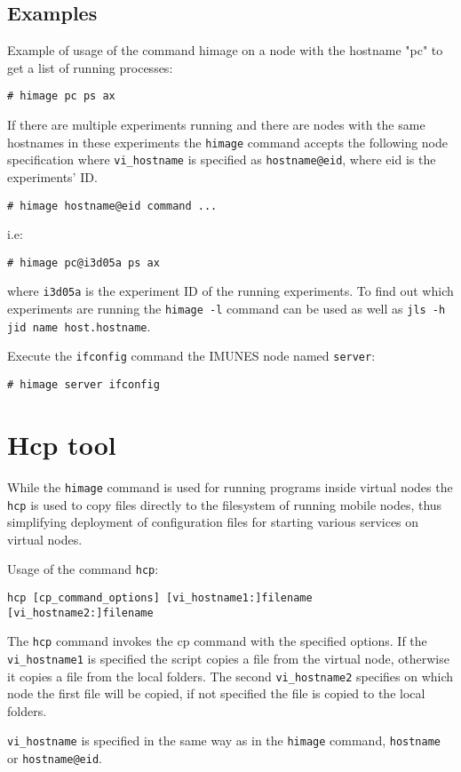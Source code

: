 \subsection{Examples}

Example of usage of the command himage on a node with the hostname "pc" to get a
list of running processes:

\texttt{\# himage pc ps ax} \hfill

If there are multiple experiments running and there are nodes with the same
hostnames in these experiments the \texttt{himage} command accepts the following
node specification where \texttt{vi\_hostname} is specified as
\texttt{hostname@eid}, where eid is the experiments' ID.

\texttt{\# himage hostname@eid command ...} \hfill

i.e:

\texttt{\# himage pc@i3d05a ps ax} \hfill

where \texttt{i3d05a} is the experiment ID of the running experiments. To find
out which experiments are running the \texttt{himage -l} command can be used as
well as \texttt{jls -h jid name host.hostname}.

Execute the \texttt{ifconfig} command the IMUNES node named \texttt{server}:

\texttt{\# himage server ifconfig}

\section{Hcp tool}

While the \texttt{himage} command is used for running programs inside virtual
nodes the \texttt{hcp} is used to copy files directly to the filesystem of
running mobile nodes, thus simplifying deployment of configuration files for
starting various services on virtual nodes.

Usage of the command \texttt{hcp}:

\texttt{hcp [cp\_command\_options] [vi\_hostname1:]filename
[vi\_hostname2:]filename} \hfill

The \texttt{hcp} command invokes the cp command with the specified options. If
the \texttt{vi\_hostname1} is specified the script copies a file from the
virtual node, otherwise it copies a file from the local folders. The second
\texttt{vi\_hostname2} specifies on which node the first file will be copied, if
not specified the file is copied to the local folders.

\texttt{vi\_hostname} is specified in the same way as in the \texttt{himage}
command, \texttt{hostname} or \texttt{hostname@eid}.

